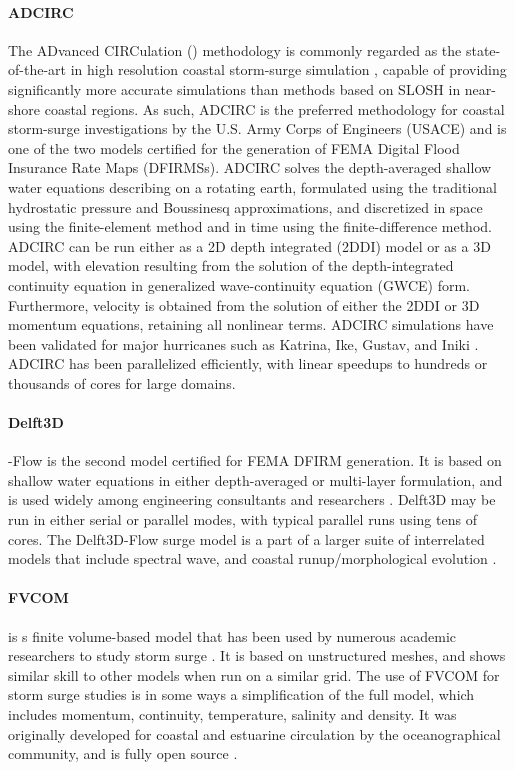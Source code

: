 \paragraph{ADCIRC} The ADvanced CIRCulation () methodology is commonly regarded as the state-of-the-art in high resolution coastal storm-surge simulation \citep{luettich1992adcirc}, capable of providing significantly more accurate simulations than methods based on SLOSH \citep{resio2008modeling} in near-shore coastal regions. As such, ADCIRC is the preferred methodology for coastal storm-surge investigations by the U.S. Army Corps of Engineers (USACE) and is one of the two models certified for the generation of FEMA Digital Flood Insurance Rate Maps (DFIRMSs). ADCIRC solves the depth-averaged shallow water equations describing on a rotating earth, formulated using the traditional hydrostatic pressure and Boussinesq approximations, and discretized in space using the finite-element method and in time using the finite-difference method. ADCIRC can be run either as a 2D depth integrated (2DDI) model or as a 3D model, with elevation resulting from the solution of the depth-integrated continuity equation in generalized wave-continuity equation (GWCE) form. Furthermore, velocity is obtained from the solution of either the 2DDI or 3D momentum equations, retaining all nonlinear terms. ADCIRC simulations have been validated for major hurricanes such as Katrina, Ike, Gustav, and Iniki \citep{kennedy2011origin,kennedy2012tropical}. ADCIRC has been parallelized efficiently, with linear speedups to hundreds or thousands of cores for large domains. 

\paragraph{Delft3D} -Flow is the second model certified for FEMA DFIRM generation. It is based on shallow water equations in either depth-averaged or multi-layer formulation, and is used widely among engineering consultants and researchers \citep{hu2015numerical,vousdoukas2016projections}. Delft3D may be run in either serial or parallel modes, with typical parallel runs using tens of cores. The Delft3D-Flow surge model is a part of a larger suite of interrelated models that include spectral wave, and coastal runup/morphological evolution \cite{deltaressystems2011delft3d}. 

\paragraph{FVCOM}  is s finite volume-based model that has been used by numerous academic researchers to study storm surge \citep{kerr2013ioos,rego2010storm}. It is based on unstructured meshes, and shows similar skill to other models when run on a similar grid. The use of FVCOM for storm surge studies is in some ways a simplification of the full model, which includes momentum, continuity, temperature, salinity and density. It was originally developed for coastal and estuarine circulation by the oceanographical community, and is fully open source \citep{chen2003unstructured}. 

